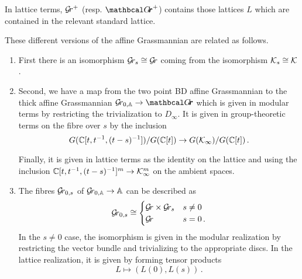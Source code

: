 \documentclass[draft]{article}
\begin{document}
\begin{itemize}
    In lattice terms, $ \mathcal{G}\!r^+$ (resp. ${\Grth}^+$) contains those lattices $L$ which are contained in the relevant standard lattice. 
\end{itemize}
These different versions of the affine Grassmannian are related as follows.  

\begin{enumerate}
    \item First there is an isomorphism $ \mathcal{G}\!r_s \cong \mathcal{G}\!r $ coming from the isomorphism $ \mathcal K_s \cong \mathcal K$.
    \item Second, we have a map from the two point BD affine Grassmannian to the thick affine Grassmannian $ \Grbd \rightarrow \Grth $
    which is given in modular terms by restricting the trivialization to $ D_\infty$.  It is given in group-theoretic terms on the fibre over $ s $ by the inclusion
    $$
    G(\mathbb C[t, t^{-1}, (t-s)^{-1}])/ G(\mathbb C[t]) \rightarrow G(\mathcal K_\infty)/G(\mathbb C[t])\,. 
    $$
    
    Finally, it is given in lattice terms as the identity on the lattice and using the inclusion $\mathbb C[t, t^{-1}, (t-s)^{-1}]^m \rightarrow \mathcal K_\infty^m$ on the ambient spaces.
    \item The fibres $ \mathcal{G}\!r_{0,s}$ of $ {\mathcal{G}\!r_{0,\mathbb A}} \rightarrow \mathbb A$ can be described as %
    $$
    \mathcal{G}\!r_{0,s} \cong 
    \begin{cases} 
        \mathcal{G}\!r \times \mathcal{G}\!r_s & s \ne 0 \\
        \mathcal{G}\!r              & s = 0\,.
    \end{cases}
    $$
    In the $s\ne 0$ case, the isomorphism is given in the modular realization by restricting the vector bundle and trivializing to the appropriate discs.  
    In the lattice realization, it is given by forming tensor products 
    $$
    L \mapsto (L(0), L(s))\,.
    $$
    

\end{enumerate}
\end{document}
